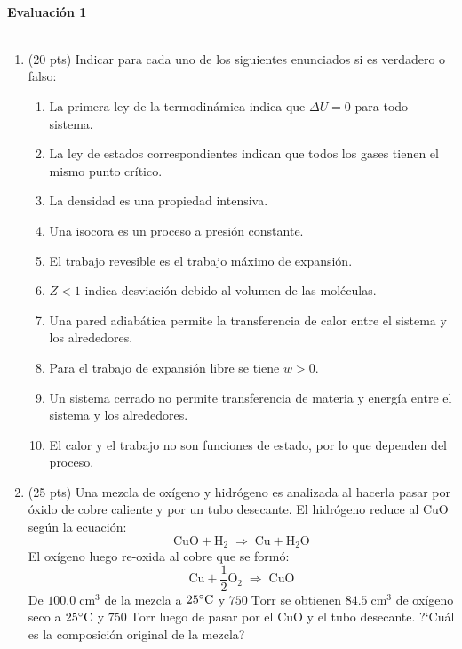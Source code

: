 \documentclass[a4paper,12pt]{article}
\begin{document}

\begin{center}
\HRule \\[0.4cm]
{ \bfseries Evaluaci\'on 1}\\ %
\HRule \\[0.4cm]
\end{center}


\begin{enumerate}

 \item (20 pts) Indicar para cada uno de los siguientes enunciados si es verdadero o falso:
 \begin{enumerate}
  \item La primera ley de la termodin\'amica indica que $\Delta U=0$ para todo sistema.
  \item La ley de estados correspondientes indican que todos los gases tienen el mismo punto cr\'itico.
  \item La densidad es una propiedad intensiva.
  \item Una isocora es un proceso a presi\'on constante.
  \item El trabajo revesible es el trabajo m\'aximo de expansi\'on.
  \item $Z<1$ indica desviaci\'on debido al volumen de las mol\'eculas.
  \item Una pared adiab\'atica permite la transferencia de calor entre el sistema y los alrededores.
  \item Para el trabajo de expansi\'on libre se tiene $w>0$.
  \item Un sistema cerrado no permite transferencia de materia y energ\'ia entre el sistema y los alrededores.
  \item El calor y el trabajo no son funciones de estado, por lo que dependen del proceso.
 \end{enumerate}

 \item (25 pts) Una mezcla de ox\'igeno y hidr\'ogeno es analizada al hacerla pasar por \'oxido de cobre caliente y por un tubo desecante. El hidr\'ogeno reduce al $\mbox{CuO}$ seg\'un la ecuaci\'on:
$$\mbox{CuO}+\mbox{H}_2\;\Rightarrow\;\mbox{Cu}+\mbox{H}_2\mbox{O}$$
El ox\'igeno luego re-oxida al cobre que se form\'o:
$$\mbox{Cu}+\frac{1}{2}\mbox{O}_2\;\Rightarrow\;\mbox{CuO}$$
De $100.0\;\mbox{cm}^3$ de la mezcla a $25\celsius$ y $750\;\mbox{Torr}$ se obtienen $84.5\;\mbox{cm}^3$ de ox\'igeno seco a $25\celsius$ y $750\;\mbox{Torr}$ luego de pasar por el $\mbox{CuO}$ y el tubo desecante. ?`Cu\'al es la composici\'on original de la mezcla?


\end{enumerate}
\end{document}
